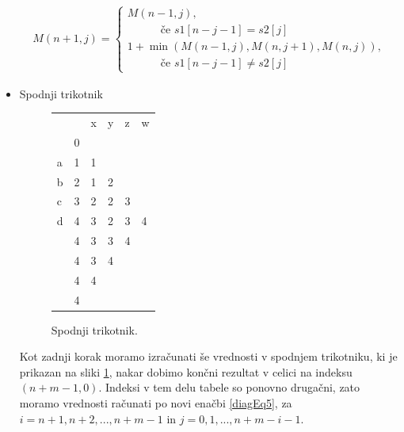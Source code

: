 \documentclass[a4paper,12pt,openright]{book}
\begin{document}
\begin{itemize}
\begin{equation}
\label{diagEq4}
\begin{aligned}
M(n+1, j) =
\begin{cases}
     M(n-1, j) ,     \\ \quad \quad \quad \text{če } s1[n-j-1]=s2[j]\\
     1 + \min(M(n-1, j), M(n, j+1), M(n, j)) , \\ \quad \quad \quad \text{če } s1[n-j-1] \neq s2[j]
  \end{cases}
\end{aligned}
\end{equation}

    \item Spodnji trikotnik
    
\begin{figure}[htb]
\centering
\begin{tabular}{|l|l|l|l|l|l|}
\cline{3-6}
\multicolumn{2}{c|}{}  & x & y & z & w\\ \cline{2-6}
\multicolumn{1}{c|}{} & 0 & \multicolumn{4}{c}{} \\ \cline{1-3}
a  & 1 & 1 &  \multicolumn{3}{c}{} \\ \cline{1-4}
b  & 2 & 1 & 2 & \multicolumn{2}{c}{} \\ \cline{1-5}
c  & 3 & 2 & 2 & 3 & \multicolumn{1}{c}{} \\ \cline{1-6}
d  & 4 & 3 & 2 & 3 & 4 \\ \hline
 \multicolumn{1}{c|}{} & 4 & 3 & 3 & 4 & \multicolumn{1}{c}{}  \\ \cline{2-5}
\multicolumn{1}{c|}{} & \cellcolor{blue!15}4 & \cellcolor{blue!15}3 & \cellcolor{blue!15}4 & \multicolumn{2}{c}{} \\ \cline{2-4}
\multicolumn{1}{c|}{} & \cellcolor{blue!15}4 & \cellcolor{blue!15}4 &  \multicolumn{3}{c}{}   \\ \cline{2-3}
\multicolumn{1}{c|}{} & \cellcolor{blue!25}4 & \multicolumn{4}{c}{}  \\ \cline{2-2}
\end{tabular}
\caption{Spodnji trikotnik.}
\label{diagMemory4}
\end{figure}

Kot zadnji korak moramo izračunati še vrednosti v spodnjem trikotniku, ki je prikazan na sliki \ref{diagMemory4}, nakar dobimo končni rezultat v celici na indeksu $(n+m-1, 0)$. Indeksi v tem delu tabele so ponovno drugačni, zato moramo vrednosti računati po novi enačbi \ref{diagEq5}, za $i=n+1,n+2,...,n+m-1$ in $j=0,1,...,n+m-i-1$. 


\end{itemize}
\end{document}
